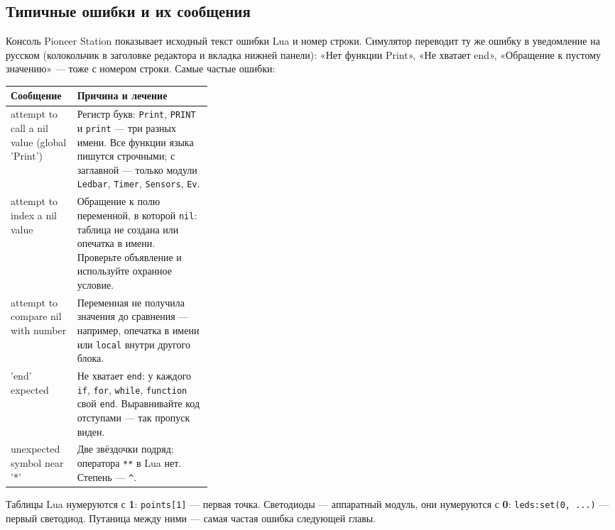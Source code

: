 \subsection{Типичные ошибки и их сообщения}

Консоль Pioneer Station показывает исходный текст ошибки Lua и номер строки. Симулятор переводит ту же ошибку в уведомление на русском (колокольчик в заголовке редактора и вкладка  нижней панели): «Нет функции Print», «Не хватает end», «Обращение к пустому значению» --- тоже с номером строки. Самые частые ошибки:

\begin{center}
\small
\begin{tabularx}{\linewidth}{@{}>{\ttfamily\raggedright\arraybackslash}p{0.33\linewidth} X@{}}
\toprule
\normalfont\textbf{Сообщение} & \textbf{Причина и лечение} \\
\midrule
attempt to call a nil value (global 'Print') & Регистр букв: \texttt{Print}, \texttt{PRINT} и \texttt{print} --- три разных имени. Все функции языка пишутся строчными; с заглавной --- только модули \texttt{Ledbar}, \texttt{Timer}, \texttt{Sensors}, \texttt{Ev}. \\
attempt to index a nil value & Обращение к полю переменной, в которой \texttt{nil}: таблица не создана или опечатка в имени. Проверьте объявление и используйте охранное условие. \\
attempt to compare nil with number & Переменная не получила значения до сравнения --- например, опечатка в имени или \texttt{local} внутри другого блока. \\
'end' expected & Не хватает \texttt{end}: у каждого \texttt{if}, \texttt{for}, \texttt{while}, \texttt{function} свой \texttt{end}. Выравнивайте код отступами --- так пропуск виден. \\
unexpected symbol near '*' & Две звёздочки подряд: оператора \texttt{**} в Lua нет. Степень --- \texttt{\^{}}. \\
\bottomrule
\end{tabularx}
\end{center}

\begin{warnbox}
Таблицы Lua нумеруются с \textbf{1}: \texttt{points[1]} --- первая точка. Светодиоды --- аппаратный модуль, они нумеруются с \textbf{0}: \texttt{leds:set(0, ...)} --- первый светодиод. Путаница между ними --- самая частая ошибка следующей главы.
\end{warnbox}

